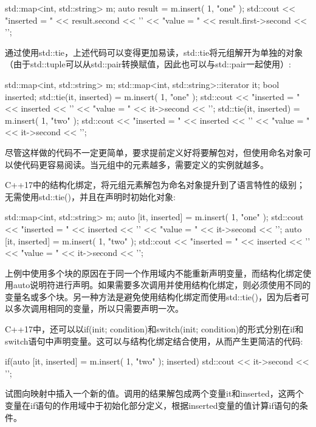 \begin{cpp}
std::map<int, std::string> m;
auto result = m.insert({ 1, "one" });
std::cout << "inserted = " << result.second << '\n'
<< "value = " << result.first->second << '\n';
\end{cpp}

通过使用std::tie，上述代码可以变得更加易读，std::tie将元组解开为单独的对象（由于std::tuple可以从std::pair转换赋值，因此也可以与std::pair一起使用）:

\begin{cpp}
std::map<int, std::string> m;
std::map<int, std::string>::iterator it;
bool inserted;
std::tie(it, inserted) = m.insert({ 1, "one" });
std::cout << "inserted = " << inserted << '\n'
          << "value = " << it->second << '\n';
std::tie(it, inserted) = m.insert({ 1, "two" });
std::cout << "inserted = " << inserted << '\n'
          << "value = " << it->second << '\n';
\end{cpp}

尽管这样做的代码不一定更简单，要求提前定义好将要解包对，但使用命名对象可以使代码更容易阅读。当元组中的元素越多，需要定义的实例就越多。

C++17中的结构化绑定，将元组元素解包为命名对象提升到了语言特性的级别；无需使用std::tie()，并且在声明时初始化对象:

\begin{cpp}
std::map<int, std::string> m;
{
    auto [it, inserted] = m.insert({ 1, "one" });
    std::cout << "inserted = " << inserted << '\n'
              << "value = " << it->second << '\n';
}
{
    auto [it, inserted] = m.insert({ 1, "two" });
    std::cout << "inserted = " << inserted << '\n'
              << "value = " << it->second << '\n';
}
\end{cpp}

上例中使用多个块的原因在于同一个作用域内不能重新声明变量，而结构化绑定使用auto说明符进行声明。如果需要多次调用并使用结构化绑定，则必须使用不同的变量名或多个块。另一种方法是避免使用结构化绑定而使用std::tie()，因为后者可以多次调用相同的变量，所以只需要声明一次。

C++17中，还可以以if(init; condition)和switch(init; condition)的形式分别在if和switch语句中声明变量。这可以与结构化绑定结合使用，从而产生更简洁的代码:

\begin{cpp}
if(auto [it, inserted] = m.insert({ 1, "two" }); inserted)
{ std::cout << it->second << '\n'; }
\end{cpp}

试图向映射中插入一个新的值。调用的结果解包成两个变量it和inserted，这两个变量在if语句的作用域中于初始化部分定义，根据inserted变量的值计算if语句的条件。

